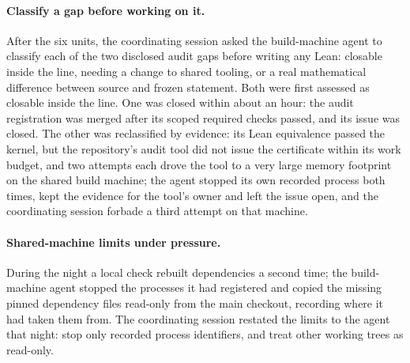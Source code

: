 \documentclass[11pt]{article}
\begin{document}
\paragraph{Classify a gap before working on it.} After the six units, the
coordinating session asked the build-machine agent to classify each of the
two disclosed audit gaps before writing any Lean: closable inside the line,
needing a change to shared tooling, or a real mathematical difference between
source and frozen statement. Both were first assessed as closable inside the
line. One was closed within about an hour: the audit registration was merged
after its scoped required checks passed, and its issue was closed. The other
was reclassified by evidence: its Lean equivalence passed the kernel, but the
repository's audit tool did not issue the certificate within its work budget,
and two attempts each drove the tool to a very large memory footprint on the
shared build machine; the agent stopped its own recorded process both times,
kept the evidence for the tool's owner and left the issue open, and the
coordinating session forbade a third attempt on that machine.

\paragraph{Shared-machine limits under pressure.} During the night a local
check rebuilt dependencies a second time; the build-machine agent stopped the
processes it had registered and copied the missing pinned dependency files
read-only from the main checkout, recording where it had taken them from. The
coordinating session restated the limits to the agent that night: stop only
recorded process identifiers, and treat other working trees as read-only.
\end{document}
